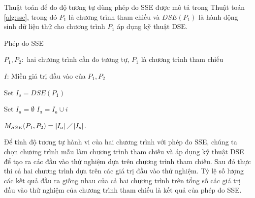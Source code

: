 Thuật toán để đo độ tương tự dùng phép đo SSE được mô tả trong
Thuật toán \ref{alg:sse}, trong đó $P_1$ là chương trình tham chiếu và
$DSE(P_{1})$ là hành động sinh dữ liệu thử cho chương trình $P_1$ áp
dụng kỹ thuật DSE.

\begin{algorithm}[h]
  \caption{Phép đo SSE}
  \label{alg:sse}
  \begin{algorithmic}
  \item $P_{1}, P_{2}:$ hai chương trình cần đo tương tự, $P_1$ là chương trình tham chiếu
  \item $I$: Miền giá trị đầu vào của $P_{1}, P_{2}$
  \item Set $I_{s} = DSE(P_{1})$ 
  \item Set $I_{a} = \emptyset$
     \State
    $I_{a} = I_{a} \cup i$
    \EndIf
    \EndFor
  \item
    $M_{SSE}(P_{1}, P_{2}) = \left|I_{a}\right| \diagup
    \left|I_{s}\right| $.
  \end{algorithmic}
\end{algorithm}

Để tính độ tương tự hành vi của hai chương trình với phép đo
SSE, chúng ta chọn chương trình mẫu làm chương trình tham
chiếu và áp dụng kỹ thuật DSE để tạo ra các đầu vào thử
nghiệm dựa trên chương trình tham chiếu. Sau đó thực thi cả hai chương
trình dựa trên các giá trị đầu vào thử nghiệm. Tỷ lệ số lượng các kết
quả đầu ra giống nhau của cả hai chương trình trên tổng số các giá trị
đầu vào thử nghiệm của chương trình tham chiếu là kết quả của phép đo
SSE.

